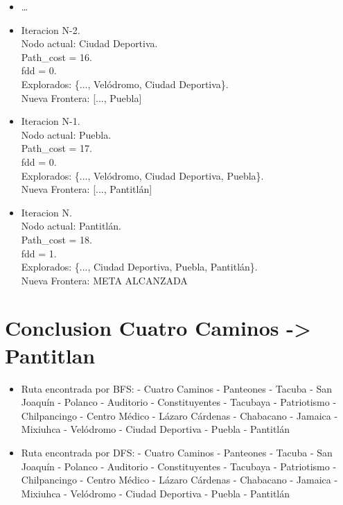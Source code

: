 \documentclass[10pt,a4paper]{article}
\begin{document}
\begin{itemize}
    \item \dots
    
    \item Iteracion N-2.\\
    Nodo actual: Ciudad Deportiva.\\
    Path\_cost = 16.\\
    fdd = 0.\\
    Explorados: \{..., Velódromo, Ciudad Deportiva\}.\\
    Nueva Frontera: [..., Puebla]

    \item Iteracion N-1.\\
    Nodo actual: Puebla.\\
    Path\_cost = 17.\\
    fdd = 0.\\
    Explorados: \{..., Velódromo, Ciudad Deportiva, Puebla\}.\\
    Nueva Frontera: [..., Pantitlán]

    \item Iteracion N.\\
    Nodo actual: Pantitlán.\\
    Path\_cost = 18.\\
    fdd = 1.\\
    Explorados: \{..., Ciudad Deportiva, Puebla, Pantitlán\}.\\
    Nueva Frontera: META ALCANZADA

\end{itemize}


\newpage
\section{Conclusion Cuatro Caminos -> Pantitlan}

\begin{itemize}
    \item  Ruta encontrada por BFS:
- Cuatro Caminos
- Panteones
- Tacuba
- San Joaquín
- Polanco
- Auditorio
- Constituyentes
- Tacubaya
- Patriotismo
- Chilpancingo
- Centro Médico
- Lázaro Cárdenas
- Chabacano
- Jamaica
- Mixiuhca
- Velódromo
- Ciudad Deportiva
- Puebla
- Pantitlán

\item  Ruta encontrada por DFS:
- Cuatro Caminos
- Panteones
- Tacuba
- San Joaquín
- Polanco
- Auditorio
- Constituyentes
- Tacubaya
- Patriotismo
- Chilpancingo
- Centro Médico
- Lázaro Cárdenas
- Chabacano
- Jamaica
- Mixiuhca
- Velódromo
- Ciudad Deportiva
- Puebla
- Pantitlán
\end{itemize}
\end{document}

